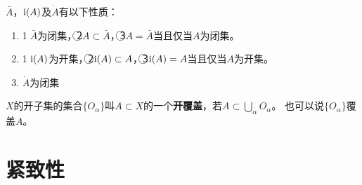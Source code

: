 \begin{theorem}
$\bar{A}$，$\operatorname{i}(A)$及$\dot{A}$有以下性质：
\begin{enumerate}[（a）]
\item \textcircled{1}$\bar{A}$为闭集，\textcircled{2}$A \subset \bar{A}$，\textcircled{3}$A = \bar{A}$当且仅当$A$为闭集。
\item \textcircled{1}$\operatorname{i}(A)$为开集，\textcircled{2}$\operatorname{i}(A) \subset A$，\textcircled{3}$\operatorname{i}(A) = A$当且仅当$A$为开集。
\item $\dot{A}$为闭集
\end{enumerate}
\end{theorem}

\begin{definition}
$X$的开子集的集合$\{O_\alpha\}$叫$A \subset X$的一个\textbf{开覆盖}，若$A \subset \bigcup\limits_\alpha O_\alpha$。
也可以说$\{O_\alpha\}$覆盖$A$。
\end{definition}

\section{紧致性}
